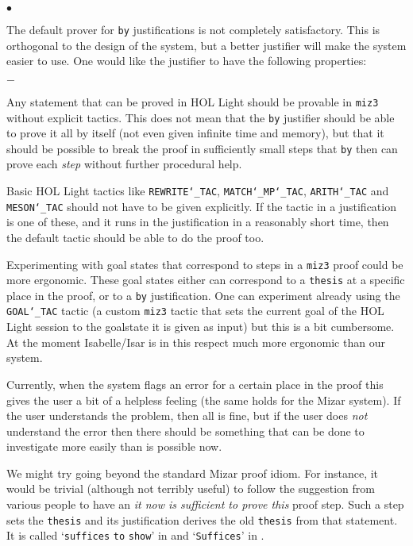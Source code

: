 \documentclass{LMCS}
\begin{document}
\begin{iteMize}{$\bullet$}
\item
The default prover for \texttt{by} justifications
is not completely satisfactory.
This is orthogonal to the design of the system, but a better
justifier will make the system easier to use.
One would like the justifier to have the following properties:

\begin{iteMize}{$-$}
\item
Any statement that can be proved in HOL Light should be provable in
\texttt{miz3} without explicit tactics.
This does not mean that the \texttt{by} justifier should be able to prove
it all by itself (not even given infinite time and memory), but that it should be possible
to break the proof in sufficiently small steps that \texttt{by}
then can prove each \emph{step} without further procedural help.

\item
Basic HOL Light tactics like \texttt{REWRITE\char`\_TAC}, \texttt{MATCH\char`\_MP\char`\_TAC},
\texttt{ARITH\char`\_{}TAC} and \texttt{MESON\char`\_TAC} should not have to be given
explicitly.
If the tactic in a justification is one of these, and it runs
in the justification in a reasonably short time, then the
default tactic should be able to do the proof too.

\end{iteMize}

\item
Experimenting with goal states that correspond to steps in a \texttt{miz3}
proof could be more ergonomic.
These goal states either can correspond to a \texttt{thesis} at a specific
place in the proof, or to a \texttt{by} justification.
One can experiment already using the \texttt{GOAL\char`\_TAC} tactic (a
custom \texttt{miz3} tactic that
sets the current goal of the HOL Light session to the goalstate it is given as input) but this is
a bit cumbersome.
At the moment Isabelle/Isar is in this respect much more ergonomic than our system.

Currently, when the system flags an error for a certain place in the
proof this gives the user a bit of a helpless feeling
(the same holds for the Mizar system).
If the user understands the problem, then all is fine,
but if the user does \emph{not} understand the error then there should
be something that can be done to investigate more easily than is
possible now.

\item
We might try going beyond the
standard Mizar proof idiom.
For instance, it would be trivial (although not terribly useful) to follow the suggestion from various people to
have an \emph{it now is sufficient to prove this}
proof step.
Such a step sets the \texttt{thesis} and its justification derives the old
\texttt{thesis} from that statement.
It is called `\texttt{suffices} \texttt{to} \texttt{show}' in \cite{har:96} and `\texttt{Suffices}' in \cite{bar:03}.


\end{iteMize}
\end{document}

